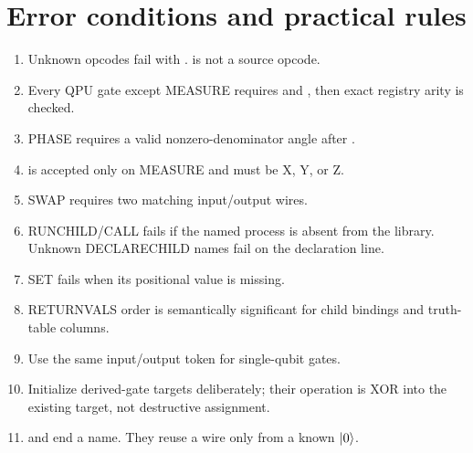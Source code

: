 \section{Error conditions and practical rules}

\begin{enumerate}
  \item Unknown opcodes fail with .  is not a
  source opcode.
  \item Every QPU gate except MEASURE requires  and , then
  exact registry arity is checked.
  \item PHASE requires a valid nonzero-denominator angle after \code{=}.
  \item {} is accepted only on MEASURE and must be X, Y, or Z.
  \item SWAP requires two matching input/output wires.
  \item RUNCHILD/CALL fails if the named process is absent from the library.
  Unknown DECLARECHILD names fail on the declaration line.
  \item SET fails when its positional value is missing.
  \item RETURNVALS order is semantically significant for child bindings and
  truth-table columns.
  \item Use the same input/output token for single-qubit gates.
  \item Initialize derived-gate targets deliberately; their operation is XOR
  into the existing target, not destructive assignment.
  \item {} and  end a name. They reuse a wire only from a known $\lvert 0\rangle$.
\end{enumerate}

